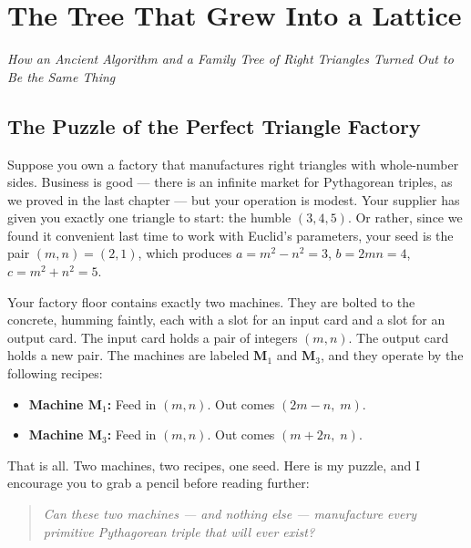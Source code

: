 \chapter{The Tree That Grew Into a Lattice}



\begin{center}\textit{How an Ancient Algorithm and a Family Tree of Right Triangles Turned Out to Be the Same Thing}\end{center}
\bigskip


\ornbreak



\section{The Puzzle of the Perfect Triangle Factory}


Suppose you own a factory that manufactures right triangles with whole-number sides. Business is good --- there is an infinite market for Pythagorean triples, as we proved in the last chapter --- but your operation is modest. Your supplier has given you exactly one triangle to start: the humble $(3, 4, 5)$. Or rather, since we found it convenient last time to work with Euclid's parameters, your seed is the pair $(m, n) = (2, 1)$, which produces $a = m^2 - n^2 = 3$, $b = 2mn = 4$, $c = m^2 + n^2 = 5$.

Your factory floor contains exactly two machines. They are bolted to the concrete, humming faintly, each with a slot for an input card and a slot for an output card. The input card holds a pair of integers $(m, n)$. The output card holds a new pair. The machines are labeled $\mathbf{M}_1$ and $\mathbf{M}_3$, and they operate by the following recipes:

\begin{itemize}[leftmargin=*]
\item \textbf{Machine $\mathbf{M}_1$:} Feed in $(m, n)$. Out comes $(2m - n,\; m)$.
\item \textbf{Machine $\mathbf{M}_3$:} Feed in $(m, n)$. Out comes $(m + 2n,\; n)$.
\end{itemize}

That is all. Two machines, two recipes, one seed. Here is my puzzle, and I encourage you to grab a pencil before reading further:

\begin{quote}
\textit{Can these two machines --- and nothing else --- manufacture every primitive Pythagorean triple that will ever exist?}
\end{quote}

